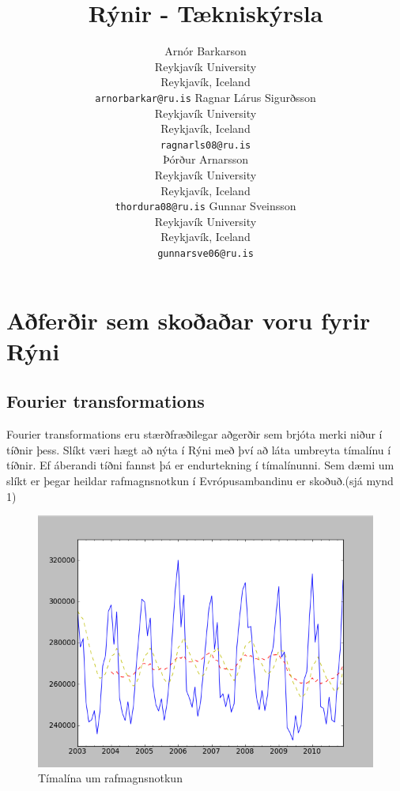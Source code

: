 \documentclass[11pt]{article}
\title{Rýnir - Tækniskýrsla}
\author{Arnór Barkarson\\
  Reykjavík University\\
  Reykjavík, Iceland\\
  {\tt arnorbarkar@ru.is}  \And  
  Ragnar Lárus Sigurðsson\\
  Reykjavík University\\
  Reykjavík, Iceland\\
  {\tt  ragnarls08@ru.is}\\ \And 
  Þórður Arnarsson\\
  Reykjavík University\\
  Reykjavík, Iceland\\
  {\tt  thordura08@ru.is}  \And 
  Gunnar Sveinsson\\
  Reykjavík University\\
  Reykjavík, Iceland\\
  {\tt  gunnarsve06@ru.is} 
}
\date{}
\begin{document}
\maketitle

\section{Aðferðir sem skoðaðar voru fyrir Rýni}
\subsection{Fourier transformations}
Fourier transformations eru stærðfræðilegar aðgerðir sem brjóta merki niður í tíðnir þess. Slíkt væri hægt að nýta í Rýni með því að láta umbreyta 
tímalínu í tíðnir. Ef áberandi tíðni fannst þá er endurtekning í tímalínunni. Sem dæmi um slíkt er þegar 
heildar rafmagnsnotkun í Evrópusambandinu er skoðuð.(sjá mynd 1)\\
\begin{figure}
 \begin{center}
 \includegraphics[width=.45\textwidth]{Rafmagnsnotkun.png}
 \caption{Tímalína um rafmagnsnotkun}
  \end{center}
\end{figure}
\hfill
\\\\\\\\\\\\\\\\\\\\\\\\\\\\\\\
\end{document}

